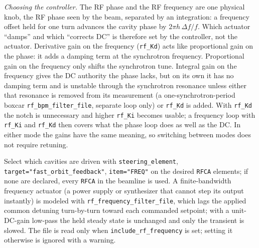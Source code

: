 \documentclass[11pt]{article}
\begin{document}
\emph{Choosing the controller.}  The RF phase and the RF frequency are one physical knob, the
RF phase seen by the beam, separated by an integration: a frequency offset held for one turn
advances the cavity phase by $2\pi h\,\Delta f/f$.  Which actuator ``damps'' and which
``corrects DC'' is therefore set by the controller, not the actuator.  Derivative gain on the
frequency (\verb|rf_Kd|) acts like proportional gain on the phase: it adds a damping term at the
synchrotron frequency.  Proportional gain on the frequency only shifts the synchrotron tune.
Integral gain on the frequency gives the DC authority the phase lacks, but on its own it has no
damping term and is unstable through the synchrotron resonance unless either that resonance is
removed from its measurement (a one-synchrotron-period boxcar \verb|rf_bpm_filter_file|, separate
loop only) or \verb|rf_Kd| is added.  With \verb|rf_Kd| the notch is unnecessary and higher
\verb|rf_Ki| becomes usable; a frequency loop with \verb|rf_Ki| and \verb|rf_Kd| then covers
what the phase loop does as well as the DC.  In either mode the gains have the same meaning,
so switching between modes does not require retuning.

Select
which cavities are driven with \verb|steering_element|, \verb|target="fast_orbit_feedback"|,
\verb|item="FREQ"| on the desired \verb|RFCA| elements; if none are declared, every
\verb|RFCA| in the beamline is used.  A finite-bandwidth frequency actuator (a power supply
or synthesizer that cannot step its output instantly) is modeled with
\verb|rf_frequency_filter_file|, which lags the applied common detuning turn-by-turn toward
each commanded setpoint; with a unit-DC-gain low-pass the held steady state is unchanged and
only the transient is slowed.  The file is read only when \verb|include_rf_frequency| is set;
setting it otherwise is ignored with a warning.
\end{document}
